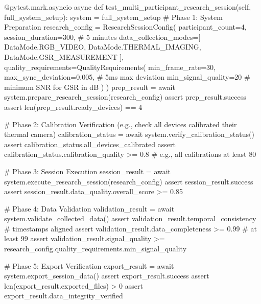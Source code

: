         @pytest.mark.asyncio
        async def test_multi_participant_research_session(self, full_system_setup):
            system = full_system_setup
            # Phase 1: System Preparation
            research_config = ResearchSessionConfig(
                participant_count=4,
                session_duration=300,  # 5 minutes
                data_collection_modes=[
                    DataMode.RGB_VIDEO,
                    DataMode.THERMAL_IMAGING,
                    DataMode.GSR_MEASUREMENT
                ],
                quality_requirements=QualityRequirements(
                    min_frame_rate=30,
                    max_sync_deviation=0.005,  # 5ms max deviation
                    min_signal_quality=20      # minimum SNR for GSR in dB
                )
            )
            prep_result = await system.prepare_research_session(research_config)
            assert prep_result.success
            assert len(prep_result.ready_devices) == 4

            # Phase 2: Calibration Verification (e.g., check all devices calibrated their thermal camera)
            calibration_status = await system.verify_calibration_status()
            assert calibration_status.all_devices_calibrated
            assert calibration_status.calibration_quality >= 0.8  # e.g., all calibrations at least 80%

            # Phase 3: Session Execution
            session_result = await system.execute_research_session(research_config)
            assert session_result.success
            assert session_result.data_quality.overall_score >= 0.85

            # Phase 4: Data Validation
            validation_result = await system.validate_collected_data()
            assert validation_result.temporal_consistency  # timestamps aligned
            assert validation_result.data_completeness >= 0.99  # at least 99%
            assert validation_result.signal_quality >= research_config.quality_requirements.min_signal_quality

            # Phase 5: Export Verification
            export_result = await system.export_session_data()
            assert export_result.success
            assert len(export_result.exported_files) > 0
            assert export_result.data_integrity_verified

